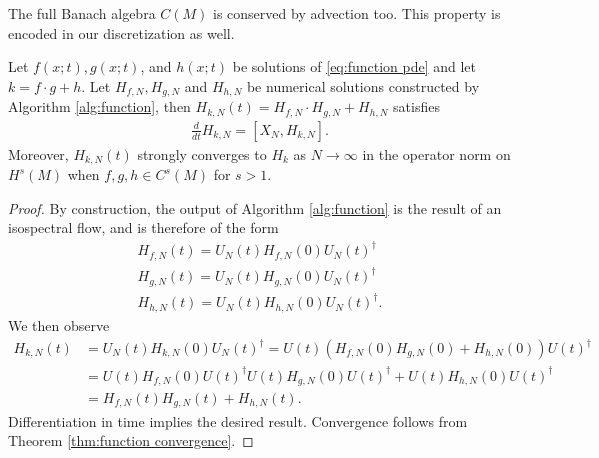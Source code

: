 \documentclass[final,leqno]{siamart}
\begin{document}
The full Banach algebra $C(M)$ is conserved by advection too.
This property is encoded in our discretization as well.
\begin{theorem} \label{thm:algebra}
	Let $f(x;t),g(x;t)$, and $h(x;t)$ be solutions of \eqref{eq:function pde} and let $k= f \cdot g + h $.
	Let $H_{f,N}, H_{g,N}$ and $H_{h,N}$ be numerical solutions constructed by Algorithm \ref{alg:function}, then $H_{k,N}(t) = H_{f,N}\cdot H_{g,N}+H_{h,N}$
	satisfies
	\begin{align}
		\frac{d}{dt} H_{k,N} = [ X_{N} , H_{k,N}].
	\end{align}
	Moreover, $H_{k,N}(t)$ strongly converges to $H_{k}$ as $N \to \infty$ in the operator norm on $H^{s}(M)$ when $f,g,h \in C^{s}(M)$ for $s>1$.
\end{theorem}
\begin{proof}
	By construction, the output of Algorithm \ref{alg:function} is the result of an isospectral flow, and is therefore of the form 
	\begin{align}
		H_{f,N}(t) = U_{N}(t) H_{f,N}(0) U_{N}(t)^{\dagger} \\
		H_{g,N}(t) = U_{N}(t) H_{g,N}(0) U_{N}(t)^{\dagger} \\
		H_{h,N}(t) = U_{N}(t) H_{h,N}(0) U_{N}(t)^{\dagger}.
	\end{align}
	We then observe
	\begin{align}
		H_{k,N}(t) &= U_{N}(t) H_{k,N}(0) U_{N}(t)^{\dagger} = U(t)\left( H_{f,N}(0) H_{g,N}(0) + H_{h,N}(0) \right) U(t)^{\dagger} \\
			&= U(t)H_{f,N}(0) U(t)^{\dagger} U(t) H_{g,N}(0)U(t)^{\dagger} + U(t) H_{h,N}(0) U(t)^{\dagger} \\
			&=H_{f,N}(t)H_{g,N}(t) + H_{h,N}(t).
	\end{align}
	Differentiation in time implies the desired result.
	Convergence follows from Theorem \ref{thm:function convergence}.
\end{proof}
\end{document}
